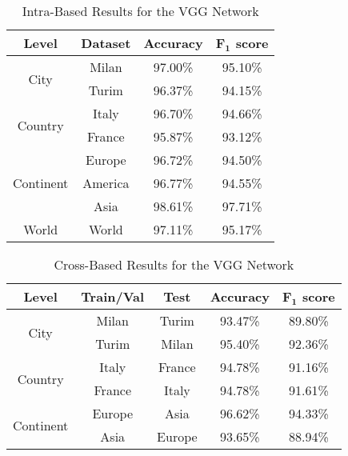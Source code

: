 \documentclass[journal]{IEEEtran}
\begin{document}
\begin{table}[h]
	\centering
	\caption{Intra-Based Results for the VGG Network}
	\label{tab:results:intra}
	\begin{tabular}{cccc}
		\toprule
		\textbf{Level}             & \textbf{Dataset} & \textbf{Accuracy} & \textbf{$\bm{F_1}$ score} \\ \midrule
		\multirow{2}{*}{City}      & Milan            & 97.00\%           & 95.10\%           \\
		& Turim            & 96.37\%           & 94.15\%           \\ \midrule
		\multirow{2}{*}{Country}   & Italy            & 96.70\%           & 94.66\%           \\
		& France           & 95.87\%           & 93.12\%           \\ \midrule
		\multirow{3}{*}{Continent} & Europe           & 96.72\%           & 94.50\%           \\
		& America          & 96.77\%           & 94.55\%           \\
		& Asia             & 98.61\%           & 97.71\%           \\ \midrule
		World                      & World            & 97.11\%           & 95.17\%           \\ \bottomrule
	\end{tabular}
\end{table}

\begin{table}[b]
	\centering
	\caption{Cross-Based Results for the VGG Network}
	\label{tab:results:cross-based}
	\begin{tabular}{ccccc}
		\toprule
		\textbf{Level}             & \textbf{Train/Val} & \textbf{Test} & \textbf{Accuracy} & \textbf{$\bm{F_1}$ score} \\ \midrule
		\multirow{2}{*}{City}      & Milan              & Turim         & 93.47\%           & 89.80\%           \\
		& Turim              & Milan         & 95.40\%           & 92.36\%           \\ \midrule
		\multirow{2}{*}{Country}   & Italy              & France        & 94.78\%           & 91.16\%           \\
		& France             & Italy         & 94.78\%           & 91.61\%           \\ \midrule
		\multirow{2}{*}{Continent} & Europe             & Asia          & 96.62\%           & 94.33\%           \\
		& Asia               & Europe        & 93.65\%           & 88.94\%           \\ \bottomrule
	\end{tabular}
\end{table}
\end{document}
